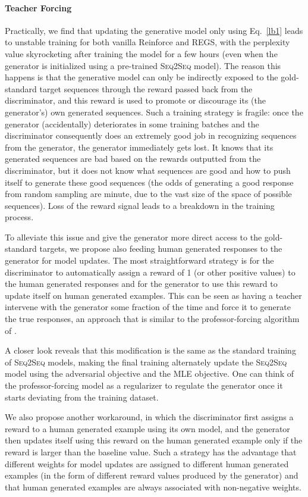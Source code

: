 \documentclass[11pt]{article}
\newcommand{\sts}{{{\textsc{Seq2Seq}}}\xspace}
\begin{document}
\paragraph{Teacher Forcing}
Practically, we find that  updating the generative model only using Eq.~\ref{lb1} leads to  unstable training for both vanilla Reinforce and REGS, with the perplexity value skyrocketing after training the model for a few hours (even when the generator is initialized using a pre-trained \sts model). The reason this happens is that the generative model can only be indirectly exposed to the gold-standard target sequences through the reward 
passed back from the
 discriminator, and this reward is used to promote or discourage its (the generator's) own generated sequences. Such a training strategy is fragile: once the generator (accidentally) deteriorates in some training batches and the discriminator consequently does an extremely good job in recognizing sequences from the generator,  
the generator immediately gets lost. It knows that its generated sequences are bad based on the rewards outputted from the discriminator, but it does not know what sequences are good and how to push itself to generate these good sequences (the odds of generating a good response from random sampling are minute, due to the vast size of the space of possible sequences). Loss of the reward signal leads to a breakdown in the training process.

To alleviate this issue and give the generator more direct access to the gold-standard targets, 
we propose also feeding human generated responses to the generator for model updates.  
The most straightforward strategy is for the discriminator to automatically assign a reward of 1 (or other positive values) to the human generated responses and for
the generator to use this reward to update itself on human generated examples. 
This can be seen as having a teacher intervene with the generator some fraction of the time and force it to generate the true responses, 
an approach that is similar to the professor-forcing algorithm of .

A closer look reveals that 
this modification is the same as the standard training of \sts models, making the final training
alternately update the \sts model using the adversarial objective and the MLE objective. One can think of the 
professor-forcing 
model as a regularizer to 
regulate the generator once it starts deviating from the training dataset.

We also propose another workaround, in which the discriminator first assigns a reward to a human generated example using its own model,  and the generator then updates itself using this reward on the human generated example only if the reward is larger than the baseline value. Such a strategy has the advantage that different weights for model updates are assigned to different human generated examples (in the form of different reward values produced by the generator) and that human generated examples are always associated with non-negative weights. 
\end{document}
